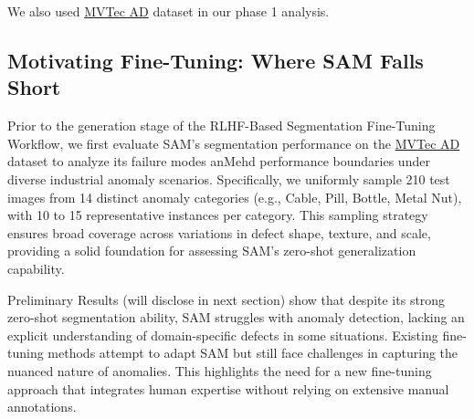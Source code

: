 \documentclass[11pt]{article}
\begin{document}
We also used \href{https://www.mvtec.com/company/research/datasets/mvtec-ad}{MVTec AD} dataset in our phase 1 analysis.



\subsection{Motivating Fine-Tuning: Where SAM Falls Short}
Prior to the generation stage of the RLHF-Based Segmentation Fine-Tuning Workflow, we first evaluate SAM’s segmentation performance on the \href{https://www.mvtec.com/company/research/datasets/mvtec-ad}{MVTec AD} dataset to analyze its failure modes anMehd performance boundaries under diverse industrial anomaly scenarios. Specifically, we uniformly sample 210 test images from 14 distinct anomaly categories (e.g., Cable, Pill, Bottle, Metal Nut), with 10 to 15 representative instances per category. This sampling strategy ensures broad coverage across variations in defect shape, texture, and scale, providing a solid foundation for assessing SAM’s zero-shot generalization capability.

Preliminary Results (will disclose in next section) show that despite its strong zero-shot segmentation ability, SAM struggles with anomaly detection, lacking an explicit understanding of domain-specific defects in some situations. Existing fine-tuning methods attempt to adapt SAM but still face challenges in capturing the nuanced nature of anomalies. This highlights the need for a new fine-tuning approach that integrates human expertise without relying on extensive manual annotations.
\end{document}
